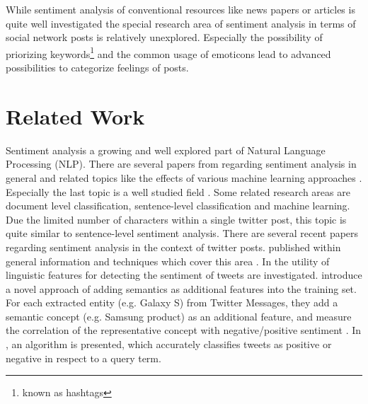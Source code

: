 While sentiment analysis of conventional resources like news papers or articles is quite well investigated the special research area of sentiment analysis in terms of social network posts is relatively unexplored. Especially the possibility of priorizing keywords\footnote{known as hashtags} and the common usage of emoticons lead to advanced possibilities to categorize feelings of posts.


\section{Related Work}
Sentiment analysis a growing and well explored part of Natural Language Processing (NLP). There are several papers from \citeauthor{Pang2008} regarding sentiment analysis in general and related topics like the effects of various machine learning approaches \autocite{Pang2002}\autocite{Pang2008}. Especially the last topic is a well studied field \autocite{Manning2000}.
Some related research areas are document level classification, sentence-level classification and machine learning. Due the limited number of characters within a single twitter post, this topic is quite similar to sentence-level sentiment analysis.
There are several recent papers regarding sentiment analysis in the context of twitter posts. \citeauthor{Agarwal2011} published within  general information and techniques which cover this area \autocite{Agarwal2011}. In  the utility of linguistic features for detecting the sentiment of tweets are investigated. 
\citeauthor{Saif2012} introduce a novel approach of adding semantics as additional features into the training set. For each extracted entity (e.g. Galaxy S) from Twitter Messages, they add a semantic concept (e.g. Samsung product) as an additional feature, and measure the correlation of the representative concept with negative/positive sentiment \autocite{Saif2012}. In , an algorithm is presented, which accurately classifies tweets as positive or negative in respect to a query term\autocite{Go2009}.